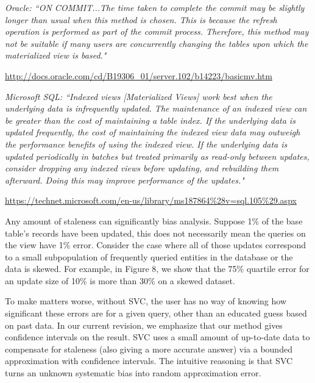 \vspace{1.0em}

\emph{Oracle: ``ON COMMIT...The time taken to complete the commit may be slightly longer than usual when this method is chosen. This is because the refresh operation is performed as part of the commit process. Therefore, this method may not be suitable if many users are concurrently changing the tables upon which the materialized view is based."}

\url{http://docs.oracle.com/cd/B19306_01/server.102/b14223/basicmv.htm}

\vspace{1.0em}

\emph{Microsoft SQL: ``Indexed views [Materialized Views] work best when the underlying data is infrequently updated. The maintenance of an indexed view can be greater than the cost of maintaining a table index. If the underlying data is updated frequently, the cost of maintaining the indexed view data may outweigh the performance benefits of using the indexed view. If the underlying data is updated periodically in batches but treated primarily as read-only between updates, consider dropping any indexed views before updating, and rebuilding them afterward. Doing this may improve performance of the updates."}

\url{https://technet.microsoft.com/en-us/library/ms187864%28v=sql.105%29.aspx}

\vspace{1.0em}

Any amount of staleness can significantly bias analysis. Suppose 1\% of the base table’s records have been updated, this does not necessarily mean the queries on the view have 1\% error.  Consider the case where all of those updates correspond to a small subpopulation of frequently queried entities in the database or the data is skewed. For example, in Figure 8, we show that the 75\% quartile error for an update size of 10\% is more than 30\% on a skewed dataset. 

To make matters worse, without SVC, the user has no way of knowing how significant these errors are for a given query, other than an educated guess based on past data. In our current revision, we emphasize that our method gives confidence intervals on the result. SVC uses a small amount of up-to-date data to compensate for staleness (also giving a more accurate answer) via a bounded approximation with confidence intervals. The intuitive reasoning is that SVC turns an unknown systematic bias into random approximation error.

